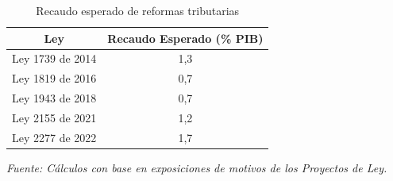 \begin{table}[h]
    \caption{Recaudo esperado de reformas tributarias}
    \label{tab:tax:summ}
    \centering
    \begin{tabular}{|c|c|}
        \hline
        \textbf{Ley} & \textbf{Recaudo Esperado (\% PIB)} \\
        \hline
        Ley 1739 de 2014 & 1,3 \\
        \hline
        Ley 1819 de 2016 & 0,7 \\
        \hline
        Ley 1943 de 2018 & 0,7 \\
        \hline
        Ley 2155 de 2021 & 1,2 \\
        \hline
        Ley 2277 de 2022 & 1,7 \\
        \hline
    \end{tabular}
\vspace{0.3cm}
\par\footnotesize{\textit{Fuente: Cálculos con base en exposiciones de motivos de los Proyectos de Ley.}}    
\end{table}
